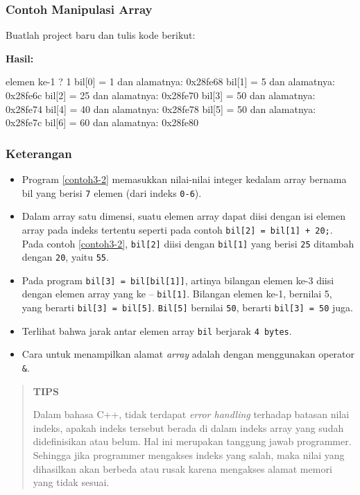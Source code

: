 \subsubsection*{Contoh  Manipulasi Array}

Buatlah project baru dan tulis kode berikut:




\textbf{Hasil:}

\begin{lcverbatim}
elemen ke-1 ? 1
bil[0] = 1 dan alamatnya: 0x28fe68
bil[1] = 5 dan alamatnya: 0x28fe6c
bil[2] = 25 dan alamatnya: 0x28fe70
bil[3] = 50 dan alamatnya: 0x28fe74
bil[4] = 40 dan alamatnya: 0x28fe78
bil[5] = 50 dan alamatnya: 0x28fe7c
bil[6] = 60 dan alamatnya: 0x28fe80
\end{lcverbatim}

\subsubsection*{Keterangan}

\begin{itemize}

\item
  Program \ref{contoh3-2} memasukkan nilai-nilai integer kedalam array bernama
  bil yang berisi \texttt{7} elemen (dari indeks \texttt{0-6}).
\item
  Dalam array satu dimensi, suatu elemen array dapat diisi dengan isi
  elemen array pada indeks tertentu seperti pada contoh
  \texttt{bil{[}2{]}\ =\ bil{[}1{]}\ +\ 20;}. Pada contoh \ref{contoh3-2},
  \texttt{bil{[}2{]}} diisi dengan \texttt{bil{[}1{]}} yang berisi
  \texttt{25} ditambah dengan \texttt{20}, yaitu \texttt{55}.
\item
  Pada program \texttt{bil{[}3{]}\ =\ bil{[}bil{[}1{]}{]}}, artinya
  bilangan elemen ke-3 diisi dengan elemen array yang ke --
  \texttt{bil{[}1{]}}. Bilangan elemen ke-1, bernilai 5, yang berarti
  \texttt{bil{[}3{]}\ =\ bil{[}5{]}}. \texttt{Bil{[}5{]}} bernilai
  \texttt{50}, berarti \texttt{bil{[}3{]}\ =\ 50} juga.
\item
  Terlihat bahwa jarak antar elemen array \texttt{bil} berjarak
  \texttt{4\ bytes}.
\item
  Cara untuk menampilkan alamat \emph{array} adalah dengan menggunakan
  operator \texttt{\&}.
\end{itemize}
\begin{quotation}
{\LARGE {}} \textbf{TIPS} 

Dalam
bahasa C++, tidak terdapat \emph{error handling} terhadap batasan nilai
indeks, apakah indeks tersebut berada di dalam indeks array yang sudah
didefinisikan atau belum. Hal ini merupakan tanggung jawab programmer.
Sehingga jika programmer mengakses indeks yang salah, maka nilai yang
dihasilkan akan berbeda atau rusak karena mengakses alamat memori yang
tidak sesuai.
\end{quotation}
 

